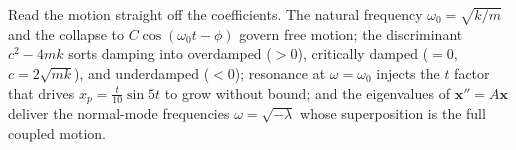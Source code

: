 \vspace{0.8em}
\begin{conceptbox}
Read the motion straight off the coefficients. The
\textcolor{accentorange}{natural frequency $\omega_0=\sqrt{k/m}$} and the collapse
to \textcolor{accentorange}{$C\cos(\omega_0 t-\phi)$} govern free motion; the
\textcolor{accentorange}{discriminant $c^2-4mk$} sorts damping into
\textcolor{accentorange}{overdamped ($>0$)}, \textcolor{accentorange}{critically
damped ($=0$, $c=2\sqrt{mk}$)}, and \textcolor{accentorange}{underdamped ($<0$)};
\textcolor{accentorange}{resonance at $\omega=\omega_0$} injects the $t$ factor that
drives $x_p=\tfrac{t}{10}\sin 5t$ to grow without bound; and the
\textcolor{accentorange}{eigenvalues of $\mathbf{x}''=A\mathbf{x}$} deliver the
normal-mode frequencies $\omega=\sqrt{-\lambda}$ whose superposition is the full
coupled motion.
\end{conceptbox}


